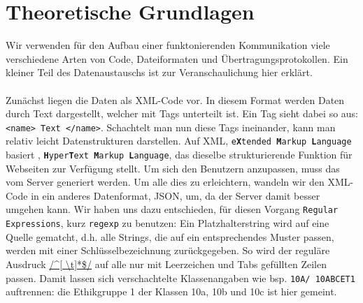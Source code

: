 \chapter{Theoretische Grundlagen}
Wir verwenden für den Aufbau einer funktonierenden Kommunikation viele verschiedene Arten von Code, Dateiformaten und Übertragungsprotokollen. Ein kleiner Teil des Datenaustauschs ist zur Veranschaulichung hier erklärt.\\\\



Zunächst liegen die Daten als XML-Code vor. In diesem Format werden Daten durch Text dargestellt, welcher mit Tags unterteilt ist. Ein Tag sieht dabei so aus: \texttt{<name> Text </name>}. Schachtelt man nun diese Tags ineinander, kann man relativ leicht Datenstrukturen darstellen. Auf XML, \texttt{e\textbf{X}tended \textbf{M}arkup \textbf{L}anguage} basiert \HTML, \texttt{\textbf{H}yper\textbf{T}ext \textbf{M}arkup \textbf{L}anguage}, das dieselbe strukturierende Funktion für Webseiten zur Verfügung stellt. Um sich den Benutzern anzupassen, muss das \HTML vom Server generiert werden. Um alle dies zu erleichtern, wandeln wir den XML-Code in ein anderes Datenformat, JSON, um, da der Server damit besser umgehen kann. Wir haben uns dazu entschieden, für diesen Vorgang \texttt{Regular Expressions}, kurz \texttt{regexp} zu benutzen: Ein Platzhalterstring wird auf eine Quelle \glqq gematcht\grqq , d.h. alle Strings, die auf ein entsprechendes Muster passen, werden mit einer Schlüsselbezeichnung zurückgegeben. So wird der reguläre Ausdruck \url{/^[ \t]*\$/} auf alle nur mit Leerzeichen und Tabs gefüllten Zeilen passen. Damit lassen sich verschachtelte Klassenangaben wie bsp. \texttt{10A/ 10ABCET1} auftrennen: die Ethikgruppe 1 der Klassen 10a, 10b und 10c ist hier gemeint.\\

